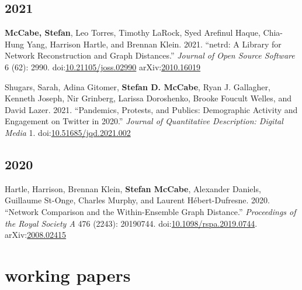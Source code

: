 \documentclass[11pt, letter]{article}
\begin{document}
\subsection{2021}
\begin{hangparas}{.25in}{1}
\textbf{McCabe, Stefan}, Leo Torres, Timothy LaRock, Syed Arefinul Haque,
Chia-Hung Yang, Harrison Hartle, and Brennan Klein. 2021.
``netrd: A Library for Network Reconstruction and Graph Distances.''
\textit{Journal of Open Source Software} 6 (62): 2990.
doi:\href{https://doi.org/10.21105/joss.02990}{10.21105/joss.02990}
arXiv:\href{https://arxiv.org/abs/2010.16019}{2010.16019} \vspace{-3.5mm}

Shugars, Sarah, Adina Gitomer, \textbf{Stefan D. McCabe}, Ryan J. Gallagher,
Kenneth Joseph, Nir Grinberg, Larissa Doroshenko, Brooke Foucult Welles, and
David Lazer. 2021. ``Pandemics, Protests, and Publics: Demographic Activity and
Engagement on Twitter in 2020.'' \textit{Journal of Quantitative Description:
  Digital Media} 1.
doi:\href{https://doi.org/10.51685/jqd.2021.002}{10.51685/jqd.2021.002}
\end{hangparas}

\subsection{2020}
\begin{hangparas}{.25in}{1}
  Hartle, Harrison, Brennan Klein, \textbf{Stefan McCabe}, Alexander Daniels,
  Guillaume St-Onge, Charles Murphy, and Laurent Hébert-Dufresne. 2020.
  ``Network Comparison and the Within-Ensemble Graph Distance.''
  \textit{Proceedings of the Royal Society A} 476 (2243): 20190744.
  doi:\href{https://doi.org/10.1098/rspa.2019.0744}{10.1098/rspa.2019.0744}.
  arXiv:\href{https://arxiv.org/abs/2008.02415}{2008.02415} \vspace{2mm}
\end{hangparas}

\section{working papers}
\end{document}
